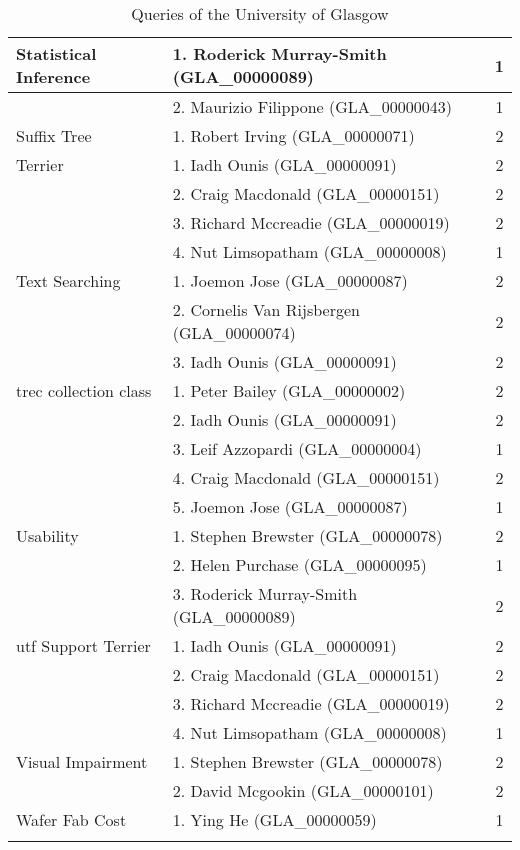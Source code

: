 \begin{longtable}{|l|l|c|}
\hline Statistical Inference & 1. Roderick Murray-Smith (GLA\_00000089) & 1 \\
\hline & 2. Maurizio Filippone (GLA\_00000043) & 1 \\
\hline Suffix Tree & 1. Robert Irving (GLA\_00000071) & 2 \\
\hline Terrier & 1. Iadh Ounis (GLA\_00000091) & 2 \\
\hline & 2. Craig Macdonald (GLA\_00000151) & 2 \\
\hline & 3. Richard Mccreadie (GLA\_00000019) & 2 \\
\hline & 4. Nut Limsopatham (GLA\_00000008) & 1 \\
\hline Text Searching & 1. Joemon Jose (GLA\_00000087) & 2 \\
\hline & 2. Cornelis Van Rijsbergen (GLA\_00000074) & 2 \\
\hline & 3. Iadh Ounis (GLA\_00000091) & 2 \\
\hline trec collection class & 1. Peter Bailey (GLA\_00000002) & 2 \\
\hline & 2. Iadh Ounis (GLA\_00000091) & 2 \\
\hline & 3. Leif Azzopardi (GLA\_00000004) & 1 \\
\hline & 4. Craig Macdonald (GLA\_00000151) & 2 \\
\hline & 5. Joemon Jose (GLA\_00000087) & 1 \\
\hline Usability & 1. Stephen Brewster (GLA\_00000078) & 2 \\
\hline & 2. Helen Purchase (GLA\_00000095) & 1 \\
\hline & 3. Roderick Murray-Smith (GLA\_00000089) & 2 \\
\hline utf Support Terrier & 1. Iadh Ounis (GLA\_00000091) & 2\\
\hline & 2. Craig Macdonald (GLA\_00000151) & 2 \\
\hline & 3. Richard Mccreadie (GLA\_00000019) & 2 \\
\hline & 4. Nut Limsopatham (GLA\_00000008) & 1 \\
\hline Visual Impairment & 1. Stephen Brewster (GLA\_00000078) & 2 \\
\hline & 2. David Mcgookin (GLA\_00000101) & 2 \\
\hline Wafer Fab Cost & 1. Ying He (GLA\_00000059) & 1 \\

\hline

\caption{Queries of the University of Glasgow} \label{table:uogQueries}
\end{longtable}
\normalsize



